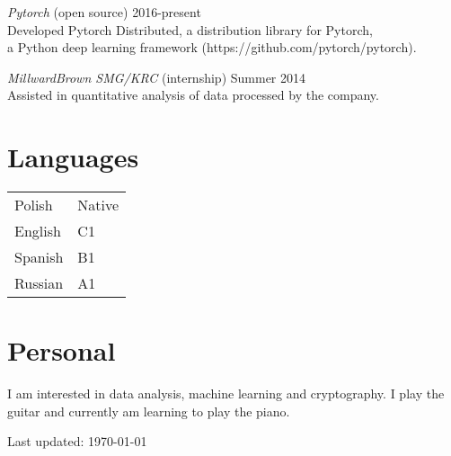 \documentclass[margin, 10pt]{res} %
\begin{document}
\begin{resume}
{\sl Pytorch} (open source) \hfill {2016-present} \\
Developed Pytorch Distributed, a distribution library for Pytorch,\\ a Python deep
learning framework (https://github.com/pytorch/pytorch).

{\sl MillwardBrown SMG/KRC} (internship) \hfill Summer 2014\\
Assisted in quantitative analysis of data processed by the company.


\section{Languages}
\begin{tabular}{@{}ll}
Polish & Native\\
English & C1\\
Spanish & B1\\
Russian & A1
\end{tabular}


\section{Personal} 
I am interested in data analysis, machine learning and cryptography.
I play the guitar and currently am learning to play the piano.


\begin{center}
  \begin{footnotesize}
    Last updated: \today \\
  \end{footnotesize}
\end{center}

\end{resume}
\end{document}

